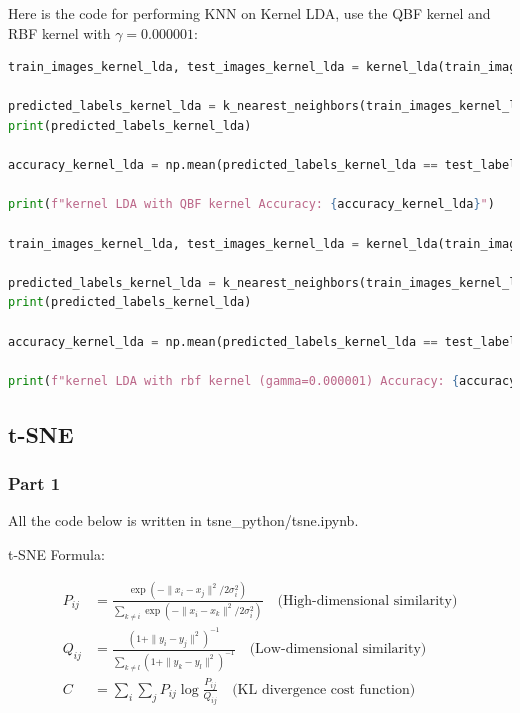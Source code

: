 \documentclass{homework}
\begin{document}
Here is the code for performing KNN on Kernel LDA, use the QBF kernel and RBF kernel with $\gamma=0.000001$:

\begin{lstlisting}[language=Python]
train_images_kernel_lda, test_images_kernel_lda = kernel_lda(train_images, train_labels, test_images, n_components=135, kernel_func=qbf_kernel)

predicted_labels_kernel_lda = k_nearest_neighbors(train_images_kernel_lda, train_labels, test_images_kernel_lda, k=3)
print(predicted_labels_kernel_lda)

accuracy_kernel_lda = np.mean(predicted_labels_kernel_lda == test_labels)

print(f"kernel LDA with QBF kernel Accuracy: {accuracy_kernel_lda}")

train_images_kernel_lda, test_images_kernel_lda = kernel_lda(train_images, train_labels, test_images, n_components=135, kernel_func=rbf_kernel, gamma=0.000001)

predicted_labels_kernel_lda = k_nearest_neighbors(train_images_kernel_lda, train_labels, test_images_kernel_lda, k=3)
print(predicted_labels_kernel_lda)

accuracy_kernel_lda = np.mean(predicted_labels_kernel_lda == test_labels)

print(f"kernel LDA with rbf kernel (gamma=0.000001) Accuracy: {accuracy_kernel_lda}")
\end{lstlisting}

\subsection{t-SNE}

\subsubsection{Part 1}

All the code below is written in tsne\_python/tsne.ipynb.

t-SNE Formula:

\begin{align*}
P_{ij} &= \frac{\exp(-\|x_i - x_j\|^2 / 2\sigma_i^2)}{\sum_{k \neq i} \exp(-\|x_i - x_k\|^2 / 2\sigma_i^2)} \quad \text{(High-dimensional similarity)} \\
Q_{ij} &= \frac{(1 + \|y_i - y_j\|^2)^{-1}}{\sum_{k \neq l} (1 + \|y_k - y_l\|^2)^{-1}} \quad \text{(Low-dimensional similarity)} \\
C &= \sum_{i} \sum_{j} P_{ij} \log \frac{P_{ij}}{Q_{ij}} \quad \text{(KL divergence cost function)}
\end{align*}
\end{document}
